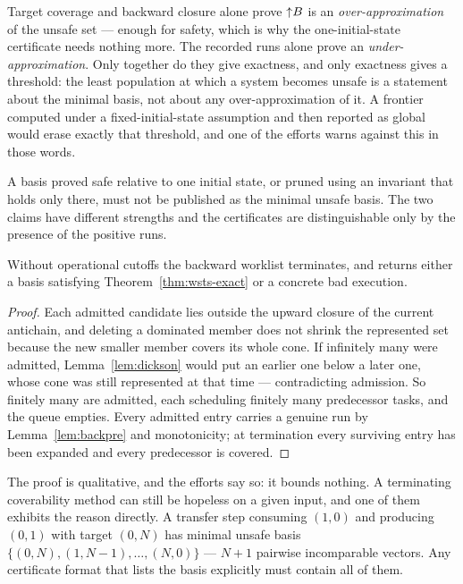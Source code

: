 \begin{remark}
Target coverage and backward closure alone prove ${\uparrow}B$ is an
\emph{over-approximation} of the unsafe set --- enough for safety, which is why
the one-initial-state certificate needs nothing more. The recorded runs alone
prove an \emph{under-approximation}. Only together do they give exactness, and
only exactness gives a threshold: the least population at which a system
becomes unsafe is a statement about the minimal basis, not about any
over-approximation of it. A frontier computed under a fixed-initial-state
assumption and then reported as global would erase exactly that threshold, and
one of the efforts warns against this in those words.
\end{remark}

\begin{invariant}
\label{inv:frontier}
A basis proved safe relative to one initial state, or pruned using an invariant
that holds only there, must not be published as the minimal unsafe basis. The
two claims have different strengths and the certificates are distinguishable
only by the presence of the positive runs.
\end{invariant}

\begin{theorem}[Termination]\label{thm:wsts-terminates}
Without operational cutoffs the backward worklist terminates, and returns
either a basis satisfying Theorem~\ref{thm:wsts-exact} or a concrete bad
execution.
\end{theorem}
\begin{proof}
Each admitted candidate lies outside the upward closure of the current
antichain, and deleting a dominated member does not shrink the represented set
because the new smaller member covers its whole cone. If infinitely many were
admitted, Lemma~\ref{lem:dickson} would put an earlier one below a later one,
whose cone was still represented at that time --- contradicting admission. So
finitely many are admitted, each scheduling finitely many predecessor tasks,
and the queue empties. Every admitted entry carries a genuine run by
Lemma~\ref{lem:backpre} and monotonicity; at termination every surviving entry
has been expanded and every predecessor is covered.
\end{proof}

The proof is qualitative, and the efforts say so: it bounds nothing. A
terminating coverability method can still be hopeless on a given input, and one
of them exhibits the reason directly. A transfer step consuming $(1,0)$ and
producing $(0,1)$ with target $(0,N)$ has minimal unsafe basis
$\{(0,N),(1,N-1),\ldots,(N,0)\}$ --- $N+1$ pairwise incomparable vectors. Any
certificate format that lists the basis explicitly must contain all of them.

